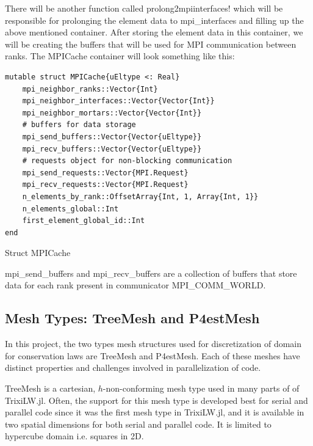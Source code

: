 There will be another function called {\ttfamily prolong2mpiinterfaces!} which will be responsible for prolonging the element data to {\ttfamily mpi\_interfaces} and filling up the above mentioned container. After storing the element data in this container, we will be creating the buffers that will be used for MPI communication between ranks. The {\ttfamily MPICache} container will look something like this:
\begin{listing}[!ht]
    \centering
    \begin{verbatim}
mutable struct MPICache{uEltype <: Real}
    mpi_neighbor_ranks::Vector{Int}
    mpi_neighbor_interfaces::Vector{Vector{Int}}
    mpi_neighbor_mortars::Vector{Vector{Int}}
    # buffers for data storage
    mpi_send_buffers::Vector{Vector{uEltype}}
    mpi_recv_buffers::Vector{Vector{uEltype}}
    # requests object for non-blocking communication
    mpi_send_requests::Vector{MPI.Request}
    mpi_recv_requests::Vector{MPI.Request}
    n_elements_by_rank::OffsetArray{Int, 1, Array{Int, 1}}
    n_elements_global::Int
    first_element_global_id::Int
end
    \end{verbatim}
    \caption{Struct MPICache}
    \label{list:2}
\end{listing}

{\ttfamily mpi\_send\_buffers} and {\ttfamily mpi\_recv\_buffers} are a collection of buffers that store data for each rank present in communicator {\ttfamily MPI\_COMM\_WORLD}.

\subsection{Mesh Types: TreeMesh and P4estMesh}
In this project, the two types mesh structures used for discretization of domain for conservation laws are {\ttfamily TreeMesh} and {\ttfamily P4estMesh}. Each of these meshes have distinct properties and challenges involved in parallelization of code.

{\ttfamily TreeMesh} is a cartesian, $h$-non-conforming mesh type used in many parts of of {\ttfamily TrixiLW.jl}. Often, the support for this mesh type is developed best for serial and parallel code since it was the first mesh type in {\ttfamily TrixiLW.jl}, and it is available in two spatial dimensions for both serial and parallel code. It is limited to hypercube domain i.e. squares in 2D.


